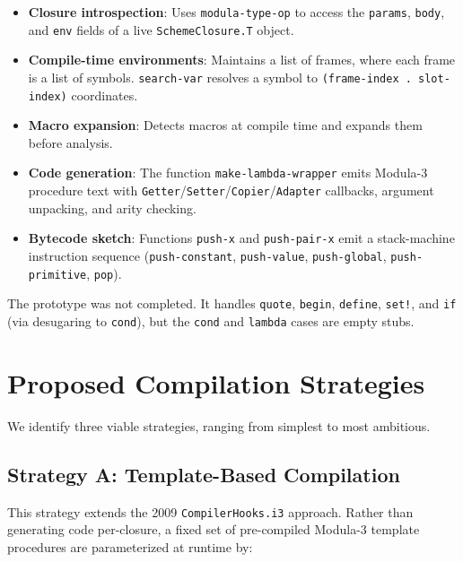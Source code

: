 \documentclass[12pt]{report}
\begin{document}
\begin{itemize}
\item \textbf{Closure introspection}: Uses \texttt{modula-type-op}
  to access the \texttt{params}, \texttt{body}, and \texttt{env}
  fields of a live \texttt{SchemeClosure.T} object.

\item \textbf{Compile-time environments}: Maintains a list of
  frames, where each frame is a list of symbols.
  \texttt{search-var} resolves a symbol to \texttt{(frame-index
  . slot-index)} coordinates.

\item \textbf{Macro expansion}: Detects macros at compile time and
  expands them before analysis.

\item \textbf{Code generation}: The function
  \texttt{make-lambda-wrapper} emits Modula-3 procedure text with
  \texttt{Getter}/\texttt{Setter}/\texttt{Copier}/\texttt{Adapter}
  callbacks, argument unpacking, and arity checking.

\item \textbf{Bytecode sketch}: Functions \texttt{push-x} and
  \texttt{push-pair-x} emit a stack-machine instruction sequence
  (\texttt{push-constant}, \texttt{push-value}, \texttt{push-global},
  \texttt{push-primitive}, \texttt{pop}).
\end{itemize}

The prototype was not completed.  It handles \texttt{quote},
\texttt{begin}, \texttt{define}, \texttt{set!}, and \texttt{if}
(via desugaring to \texttt{cond}), but the \texttt{cond} and
\texttt{lambda} cases are empty stubs.


\chapter{Proposed Compilation Strategies}
\label{ch:strategies}

We identify three viable strategies, ranging from simplest to most
ambitious.

\section{Strategy A: Template-Based Compilation}
\label{sec:stratA}

This strategy extends the 2009 \texttt{CompilerHooks.i3} approach.
Rather than generating code per-closure, a fixed set of
pre-compiled Modula-3 template procedures are parameterized at
runtime by:
\end{document}
